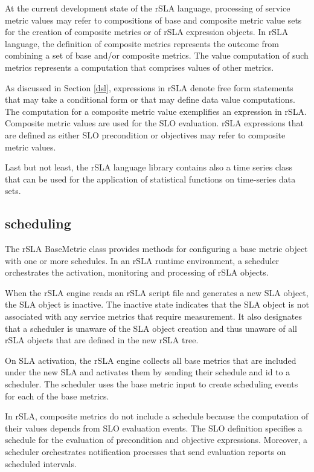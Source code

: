 At the current development state of the rSLA language, processing of service metric values may refer to compositions of base and composite metric value sets for the creation of composite metrics or of rSLA expression objects. In rSLA language, the definition of composite metrics represents the outcome from combining a set of base and/or composite metrics. The value computation of such metrics represents a computation that comprises values of other metrics. 

As discussed in Section \ref{dsl}, expressions in rSLA denote free form statements that may take a conditional form or that may define data value computations. The computation for a composite metric value exemplifies an expression in rSLA. Composite metric values are used for the SLO evaluation. rSLA expressions that are defined as either SLO precondition or objectives may refer to composite metric values.

Last but not least, the rSLA language library contains also a time series class that can be used for the application of statistical functions on time-series data sets. 

\subsection{scheduling}\label{schedule}
The rSLA BaseMetric class provides methods for configuring a base metric object with one or more schedules. In an rSLA runtime environment, a scheduler orchestrates the activation, monitoring and processing of rSLA objects.

When the rSLA engine reads an rSLA script file and generates a new SLA object, the SLA object is inactive. The inactive state indicates that the SLA object is not associated with any service metrics that require measurement. It also designates that a scheduler is unaware of the SLA object creation and thus unaware of all rSLA objects that are defined in the new rSLA tree.

On SLA activation, the rSLA engine collects all base metrics that are included under the new SLA and activates them by sending their schedule and id to a scheduler. The scheduler uses the base metric input to create scheduling events for each of the base metrics. 

In rSLA, composite metrics do not include a schedule because the computation of their values depends from SLO evaluation events. The SLO definition specifies a schedule for the evaluation of precondition and objective expressions. Moreover, a scheduler orchestrates notification processes that send evaluation reports on scheduled intervals.

